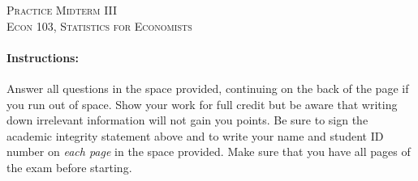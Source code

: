 \documentclass[addpoints,12pt]{exam}
\begin{document}
\begin{center}
\textsc{\Large Practice Midterm III\\\vspace{0.15in} \normalsize Econ 103, Statistics for Economists }%

\vspace{2em}



\end{center}


\vspace{2em}
\begin{center}
\end{center}
\vspace{0.2in}

\vspace{0.2in}

\noindent{}

\vspace{0.2in}

\noindent{}
\hfill
{}

\vspace{2em}


\vspace{2em}

\paragraph{Instructions:} Answer all questions in the space provided, continuing on the back of the page if you run out of space. Show your work for full credit but be aware that writing down irrelevant information will not gain you points. Be sure to sign the academic integrity statement above and to write your name and student ID number on \emph{each page} in the space provided. Make sure that you have all pages of the exam before starting.
\end{document}
